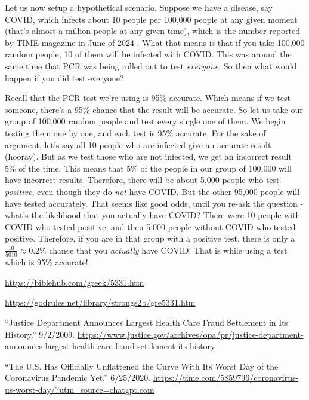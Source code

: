 \documentclass[10pt]{article}
\begin{document}
\begin{multicols}{2}
Let us now setup a hypothetical scenario. Suppose we have a disease, say COVID, which infects about 10 people per 100,000 people at any given moment (that's almost a million people at any given time), which is the number reported by TIME magazine in June of 2024 \cite{TIME}. What that means is that if you take 100,000 random people, 10 of them will be infected with COVID. This was around the same time that PCR was being rolled out to test \textit{everyone}. So then what would happen if you did test everyone?

Recall that the PCR test we're using is 95\% accurate. Which means if we test someone, there's a 95\% chance that the result will be accurate. So let us take our group of 100,000 random people and test every single one of them. We begin testing them one by one, and each test is 95\% accurate. For the sake of argument, let's say all 10 people who are infected give an accurate result (hooray). But as we test those who are not infected, we get an incorrect result 5\% of the time. This means that 5\% of the people in our group of 100,000 will have incorrect results. Therefore, there will be about 5,000 people who test \textit{positive}, even though they do \textit{not} have COVID. But the other 95,000 people will have tested accurately. That seems like good odds, until you re-ask the question - what's the likelihood that you actually have COVID? There were 10 people with COVID who tested positive, and then 5,000 people without COVID who tested positive. Therefore, if you are in that group with a positive test, there is only a $\frac{10}{5010} \approx 0.2\%$ chance that you \textit{actually} have COVID! That is while using a test which is 95\% accurate!





\begin{thebibliography}{9}
	{\footnotesize
		
	 \url{https://biblehub.com/greek/5331.htm}
	
	 \url{https://godrules.net/library/strongs2b/gre5331.htm}
	
	 ``Justice Department Announces Largest Health Care Fraud Settlement in Its History.'' 9/2/2009. \url{https://www.justice.gov/archives/opa/pr/justice-department-announces-largest-health-care-fraud-settlement-its-history}
	
	 ``The U.S. Has Officially Unflattened the Curve With Its Worst Day of the Coronavirus Pandemic Yet.'' 6/25/2020. \url{https://time.com/5859796/coronavirus-us-worst-day/?utm_source=chatgpt.com}
	
	}
\end{thebibliography}

\end{multicols}


\end{document}
